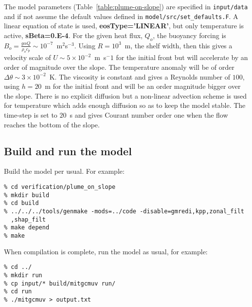 The model parameters (Table~\ref{table:plume-on-slope}) are specified
in {\tt input/data} and if not assume the default values defined in
{\tt model/src/set\_defaults.F}. A linear equation of state is used,
{\bf eosType='LINEAR'}, but only temperature is active, {\bf
sBeta=0.E-4}. For the given heat flux, $Q_o$, the buoyancy forcing is
$B_o = \frac{g \alpha Q}{\rho_o c_p} \sim
10^{-7}$~m$^2$s$^{-3}$. Using $R=10^3$~m, the shelf width, then this
gives a velocity scale of $U\sim 5 \times 10^{-2}$~m~s$^-1$ for the
initial front but will accelerate by an order of magnitude over the
slope. The temperature anomaly will be of order $\Delta \theta \sim 3
\times 10^{-2}$~K.  The viscosity is constant and gives a Reynolds
number of $100$, using $h=20$~m for the initial front and will be an
order magnitude bigger over the slope. There is no explicit diffusion
but a non-linear advection scheme is used for temperature which adds
enough diffusion so as to keep the model stable. The time-step is set
to $20$~s and gives Courant number order one when the flow reaches the
bottom of the slope.

\subsection{Build and run the model}
\label{www:tutorials}

Build the model per usual. For example:
\begin{verbatim}
% cd verification/plume_on_slope
% mkdir build
% cd build
% ../../../tools/genmake -mods=../code -disable=gmredi,kpp,zonal_filt
  ,shap_filt
% make depend
% make
\end{verbatim}

When compilation is complete, run the model as usual, for example:
\begin{verbatim}
% cd ../
% mkdir run
% cp input/* build/mitgcmuv run/
% cd run
% ./mitgcmuv > output.txt
\end{verbatim}
